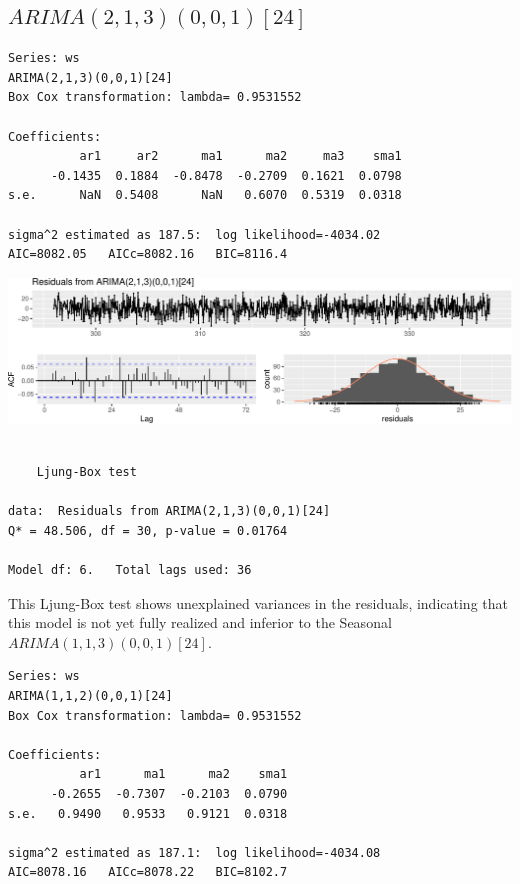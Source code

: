 \documentclass[openany]{book}
\begin{document}
\hypertarget{arima21300124}{%
\subsection{\texorpdfstring{\(ARIMA(2,1,3)(0,0,1)[24]\)}{ARIMA(2,1,3)(0,0,1){[}24{]}}}\label{arima21300124}}

\begin{verbatim}
Series: ws 
ARIMA(2,1,3)(0,0,1)[24] 
Box Cox transformation: lambda= 0.9531552 

Coefficients:
          ar1     ar2      ma1      ma2     ma3    sma1
      -0.1435  0.1884  -0.8478  -0.2709  0.1621  0.0798
s.e.      NaN  0.5408      NaN   0.6070  0.5319  0.0318

sigma^2 estimated as 187.5:  log likelihood=-4034.02
AIC=8082.05   AICc=8082.16   BIC=8116.4
\end{verbatim}

\includegraphics{Group2_Project1_Fall2019_files/figure-latex/unnamed-chunk-23-1.pdf}

\begin{verbatim}

    Ljung-Box test

data:  Residuals from ARIMA(2,1,3)(0,0,1)[24]
Q* = 48.506, df = 30, p-value = 0.01764

Model df: 6.   Total lags used: 36
\end{verbatim}

This Ljung-Box test shows unexplained variances in the residuals,
indicating that this model is not yet fully realized and inferior to the
Seasonal \(ARIMA (1,1,3)(0,0,1)[24]\).

\begin{verbatim}
Series: ws 
ARIMA(1,1,2)(0,0,1)[24] 
Box Cox transformation: lambda= 0.9531552 

Coefficients:
          ar1      ma1      ma2    sma1
      -0.2655  -0.7307  -0.2103  0.0790
s.e.   0.9490   0.9533   0.9121  0.0318

sigma^2 estimated as 187.1:  log likelihood=-4034.08
AIC=8078.16   AICc=8078.22   BIC=8102.7
\end{verbatim}
\end{document}
